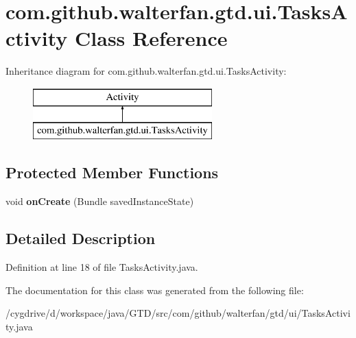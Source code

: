 \hypertarget{classcom_1_1github_1_1walterfan_1_1gtd_1_1ui_1_1TasksActivity}{\section{com.\-github.\-walterfan.\-gtd.\-ui.\-Tasks\-Activity Class Reference}
\label{classcom_1_1github_1_1walterfan_1_1gtd_1_1ui_1_1TasksActivity}
}
Inheritance diagram for com.\-github.\-walterfan.\-gtd.\-ui.\-Tasks\-Activity\-:\begin{figure}[H]
\begin{center}
\leavevmode
\includegraphics[height=2.000000cm]{classcom_1_1github_1_1walterfan_1_1gtd_1_1ui_1_1TasksActivity}
\end{center}
\end{figure}
\subsection*{Protected Member Functions}
\begin{DoxyCompactItemize}
\item 
\hypertarget{classcom_1_1github_1_1walterfan_1_1gtd_1_1ui_1_1TasksActivity_ab39743aa529abfc555671b7e5b9649ff}{void {\bfseries on\-Create} (Bundle saved\-Instance\-State)}\label{classcom_1_1github_1_1walterfan_1_1gtd_1_1ui_1_1TasksActivity_ab39743aa529abfc555671b7e5b9649ff}

\end{DoxyCompactItemize}


\subsection{Detailed Description}


Definition at line 18 of file Tasks\-Activity.\-java.



The documentation for this class was generated from the following file\-:\begin{DoxyCompactItemize}
\item 
/cygdrive/d/workspace/java/\-G\-T\-D/src/com/github/walterfan/gtd/ui/Tasks\-Activity.\-java\end{DoxyCompactItemize}
